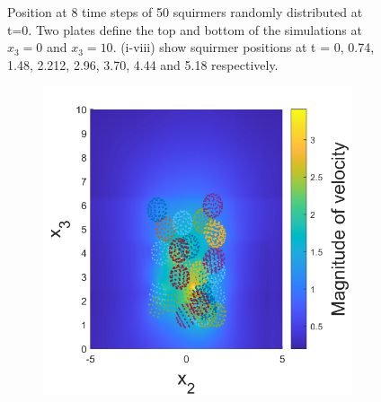 \begin{figure}
\begin{subfigure}[b]{0.22\textwidth}
    \caption[]{\label{fig:squirmerPosH}}
\end{subfigure}
\label{fig:SquiremerGyroPo}
\caption[Position at 8 time steps of 50 squiremers randomly distributed at t=0.]{Position at 8 time steps of 50 squirmers randomly distributed at t=0. Two plates define the top and bottom of the simulations at $x_3 = 0$ and  $x_3 = 10$. (i-viii) show squirmer positions at t = 0, 0.74, 1.48, 2.212, 2.96, 3.70, 4.44 and 5.18 respectively.}
\end{figure}

\begin{figure}
\centering
\begin{subfigure}[b]{0.22\textwidth}
    \centering
    \includegraphics[width=\textwidth]{Images/squirmers/Gyro-1.pdf}
    \caption[]{\label{fig:squirmerA}}
\end{subfigure}
\begin{subfigure}[b]{0.22\textwidth}
    \centering

\end{subfigure}
\end{figure}
